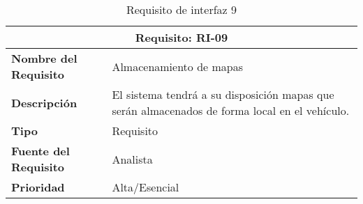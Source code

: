 \begin{table}[H]
\begin{center}
\begin{tabular}{p{} p{7cm}}
\multicolumn{2}{c}{\textbf{Requisito: RI-09} } \\
\hline \hline
\textbf{Nombre del Requisito} &  Almacenamiento de mapas\\
\hline
\textbf{Descripción} & El sistema tendrá a su disposición mapas que serán almacenados de forma local en el vehículo. \\
\hline
\textbf{Tipo} & Requisito \\
\hline
\textbf{Fuente del Requisito} & Analista \\
\hline
\textbf{Prioridad} & Alta/Esencial \\ \hline
\end{tabular}
\caption{Requisito de interfaz 9}
\label{tab:RI-09}
\end{center}
\end{table}
